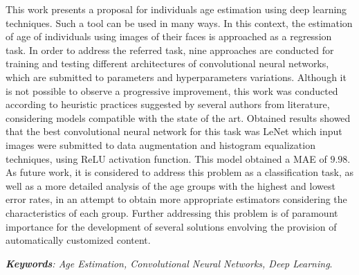 
  This work presents a proposal for individuals age estimation using deep learning techniques. Such a tool can be used in many ways. In this context, the estimation of age of individuals using images of their faces is approached as a regression task. In order to address the referred task, nine approaches are conducted for training and testing different architectures of convolutional neural networks, which are submitted to parameters and hyperparameters variations. Although it is not possible to observe a progressive improvement, this work was conducted according to heuristic practices suggested by several authors from literature, considering models compatible with the state of the art. Obtained results showed that the best convolutional neural network for this task was LeNet which input images were submitted to data augmentation and histogram equalization techniques, using ReLU activation function. This model obtained a MAE of $9.98$. As future work, it is considered to address this problem as a classification task, as well as a more detailed analysis of the age groups with the highest and lowest error rates, in an attempt to obtain more appropriate estimators considering the characteristics of each group. Further addressing this problem is of paramount importance for the development of several solutions envolving the provision of automatically customized content.

  \noindent \emph{\textbf{Keywords}: Age Estimation, Convolutional Neural Networks, Deep Learning}.
